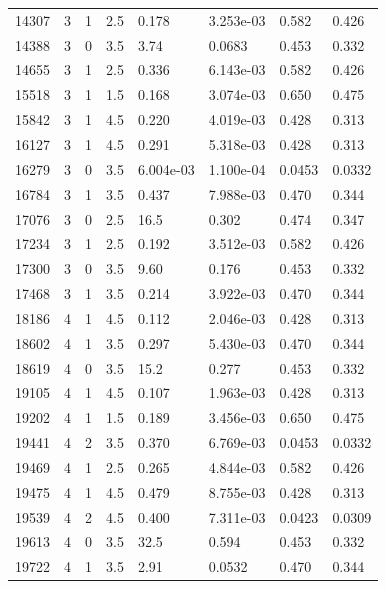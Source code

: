 \documentclass[preview]{standalone}
\begin{document}
{{{\begin{tabular}{L{1.2cm}C{1.2cm} C{0.3cm}C{0.5cm} C{1.4cm}C{1.4cm} C{1.4cm}C{1.4cm}}
  14307  &     3  & 1     & 2.5 &  0.178  & 3.253e-03  & 0.582 &  0.426   \\ 
  14388  &     3  & 0     & 3.5 &  3.74  & 0.0683  & 0.453 &  0.332   \\ 
  14655  &     3  & 1     & 2.5 &  0.336  & 6.143e-03  & 0.582 &  0.426   \\ 
  15518  &     3  & 1     & 1.5 &  0.168  & 3.074e-03  & 0.650 &  0.475   \\ 
  15842  &     3  & 1     & 4.5 &  0.220  & 4.019e-03  & 0.428 &  0.313   \\ 
  16127  &     3  & 1     & 4.5 &  0.291  & 5.318e-03  & 0.428 &  0.313   \\ 
  16279  &     3  & 0     & 3.5 &  6.004e-03  & 1.100e-04  & 0.0453 &  0.0332   \\ 
  16784  &     3  & 1     & 3.5 &  0.437  & 7.988e-03  & 0.470 &  0.344   \\ 
  17076  &     3  & 0     & 2.5 &  16.5  & 0.302  & 0.474 &  0.347   \\ 
  17234  &     3  & 1     & 2.5 &  0.192  & 3.512e-03  & 0.582 &  0.426   \\ 
  17300  &     3  & 0     & 3.5 &  9.60  & 0.176  & 0.453 &  0.332   \\ 
  17468  &     3  & 1     & 3.5 &  0.214  & 3.922e-03  & 0.470 &  0.344   \\ 
  18186  &     4  & 1     & 4.5 &  0.112  & 2.046e-03  & 0.428 &  0.313   \\ 
  18602  &     4  & 1     & 3.5 &  0.297  & 5.430e-03  & 0.470 &  0.344   \\ 
  18619  &     4  & 0     & 3.5 &  15.2  & 0.277  & 0.453 &  0.332   \\ 
  19105  &     4  & 1     & 4.5 &  0.107  & 1.963e-03  & 0.428 &  0.313   \\ 
  19202  &     4  & 1     & 1.5 &  0.189  & 3.456e-03  & 0.650 &  0.475   \\ 
  19441  &     4  & 2     & 3.5 &  0.370  & 6.769e-03  & 0.0453 &  0.0332   \\ 
  19469  &     4  & 1     & 2.5 &  0.265  & 4.844e-03  & 0.582 &  0.426   \\ 
  19475  &     4  & 1     & 4.5 &  0.479  & 8.755e-03  & 0.428 &  0.313   \\ 
  19539  &     4  & 2     & 4.5 &  0.400  & 7.311e-03  & 0.0423 &  0.0309   \\ 
  19613  &     4  & 0     & 3.5 &  32.5  & 0.594  & 0.453 &  0.332   \\ 
  19722  &     4  & 1     & 3.5 &  2.91  & 0.0532  & 0.470 &  0.344   \\ 

\end{tabular}}}}
\end{document}
